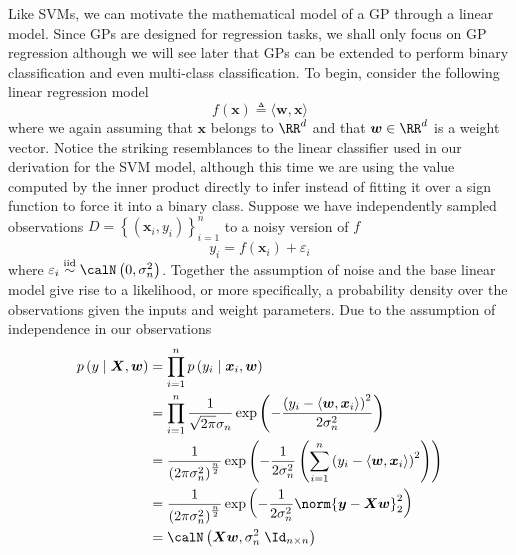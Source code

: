 Like SVMs, we can motivate the mathematical model of a GP through a linear model. Since GPs are designed for regression tasks, we shall only focus on GP regression although we will see later that GPs can be extended to perform binary classification and even multi-class classification. To begin, consider the following linear regression model
\begin{equation} \label{eq: gp_lin_reg_base}
    f \left( \bm{x} \right) \triangleq \langle \bm{w} , \bm{x} \rangle
\end{equation}
where we again assuming that $\bm{x}$ belongs to $\RR^d$ and that $\bm{w} \in \RR^d$ is a weight vector. Notice the striking resemblances to the linear classifier used in our derivation for the SVM model, although this time we are using the value computed by the inner product directly to infer instead of fitting it over a sign function to force it into a binary class. Suppose we have independently sampled observations $D = \left\{ \left( \bm{x}_i , y_i \right) \right\}_{i=1}^{n}$ to a noisy version of $f$
\[
    y_i = f \left( \bm{x}_i \right) + \varepsilon_i
\]
where $\varepsilon_i \overset{\text{iid}}{\sim} \calN \left( 0 , \sigma_n^2 \right) $. Together the assumption of noise and the base linear model give rise to a likelihood, or more specifically, a probability density over the observations given the inputs and weight parameters. Due to the assumption of independence in our observations
\begin{align} \label{eq: y_cond_X_w}
    p \left( y \mid \bm{X}, \bm{w} \right)
     & = \prod_{i=1}^{n} p \left( y_i \mid \bm{x}_i , \bm{w} \right)                                                                                                                                 \\ \nonumber
     & = \prod_{i=1}^{n} \frac{1}{\sqrt{2 \pi} \sigma_n} \exp \left( - \frac{\left( y_i - \langle \bm{w} , \bm{x}_i \rangle \right)^2}{2 \sigma_n^2} \right)                                         \\ \nonumber
     & = \frac{1}{\left( 2 \pi \sigma_n^2 \right)^{\frac{n}{2}}} \exp \left( - \frac{1}{2 \sigma_n^2} \left( \sum_{i=1}^{n} \left( y_i - \langle \bm{w} , \bm{x}_i \rangle \right)^2 \right) \right) \\ \nonumber
     & = \frac{1}{\left( 2 \pi \sigma_n^2 \right)^{\frac{n}{2}}} \exp \left( - \frac{1}{2 \sigma_n^2} \norm{\bm{y} - \bm{X} \bm{w}}^2_2 \right)                                                      \\ \nonumber
     & = \calN \left( \bm{X} \bm{w} , \sigma_n^2 \; \Id_{n \times n} \right)
\end{align}
